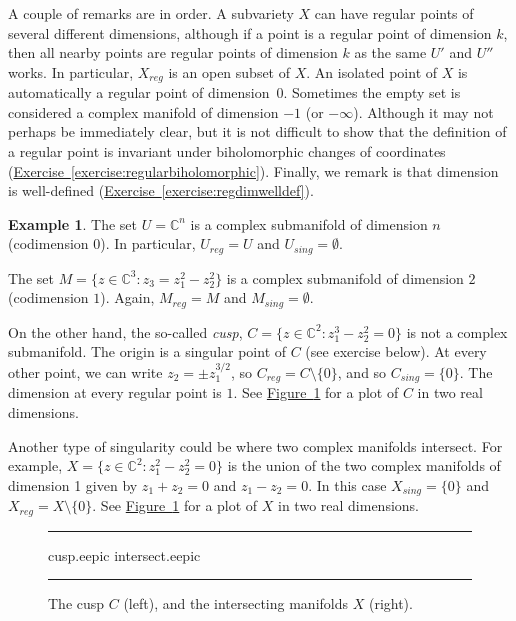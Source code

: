\documentclass[12pt,openany]{book}
\newcommand{\C}{{\mathbb{C}}}
\newcommand{\myindex}[1]{#1\index{#1}}
\theoremstyle{plain}
\theoremstyle{remark}
\theoremstyle{definition}
\newenvironment{myfig}{%
\begin{figure}[h!t]
\noindent\rule{\textwidth}{0.5pt}\vspace{12pt}\par\centering}%
{\par\noindent\rule{\textwidth}{0.5pt}
\end{figure}}
\theoremstyle{exercise}
\theoremstyle{example}
\newtheorem{example}[thm]{Example}
\newcommand{\figureref}[1]{\hyperref[#1]{Figure~\ref*{#1}}}
\newcommand{\exerciseref}[1]{\hyperref[#1]{Exercise~\ref*{#1}}}
\begin{document}
A couple of remarks are in order.
A subvariety $X$ can have
regular points of several different dimensions, although if a point
is a regular point of dimension $k$, then all nearby points are regular
points of dimension $k$ as the same $U'$ and $U''$ works.
In particular, $X_{\mathit{reg}}$ is an open subset of $X$.
An isolated point of $X$ is automatically a regular point of
dimension~$0$.
Sometimes the empty set is considered a complex manifold of dimension $-1$ (or
$-\infty$).
Although it may not perhaps be immediately clear, but it is not
difficult to show that the definition 
of a regular point is invariant under biholomorphic changes of coordinates
(\exerciseref{exercise:regularbiholomorphic}).
Finally, we remark is that dimension is well-defined
(\exerciseref{exercise:regdimwelldef}).

\begin{example}
The set $U = \C^n$ is a complex submanifold of dimension $n$
(codimension $0$).
In particular, $U_{\mathit{reg}} = U$ and $U_{\mathit{sing}} = \emptyset$.

The set $M = \bigl\{ z \in \C^3 : z_3 = z_1^2 - z_2^2 \bigr\}$ is a complex submanifold of
dimension $2$ (codimension $1$).  Again,
$M_{\mathit{reg}} = M$ and $M_{\mathit{sing}} = \emptyset$.

On the other hand, the so-called \emph{\myindex{cusp}},
$C = \bigl\{ z \in \C^2 : z_1^3-z_2^2 = 0 \bigr\}$ is not a complex
submanifold.  The origin is a singular point of $C$
(see exercise below).
At every other point, we can write $z_2 = \pm z_1^{3/2}$,
so $C_{\mathit{reg}} = C \setminus \{0\}$, and so $C_{\mathit{sing}} = \{ 0
\}$.
The dimension at every regular point is $1$.
See \figureref{fig:cuspintersect} for a
plot of $C$ in two real dimensions.

Another type of singularity could be where two complex manifolds
intersect.  For example, $X = \{ z \in \C^2 : z_1^2-z_2^2 = 0 \}$
is the union of the two complex manifolds of dimension 1 given by $z_1+z_2=0$ and
$z_1-z_2=0$.  In this case $X_{\mathit{sing}} = \{ 0 \}$ and
$X_{\mathit{reg}} = X \setminus \{ 0 \}$.
See \figureref{fig:cuspintersect} for a
plot of $X$ in two real dimensions.

\begin{myfig}
\medskip
{cusp.eepic}
\qquad
\qquad
{intersect.eepic}
\bigskip
\caption{The cusp $C$ (left), and the intersecting manifolds $X$
(right).\label{fig:cuspintersect}}
\end{myfig}
\end{example}
\end{document}
